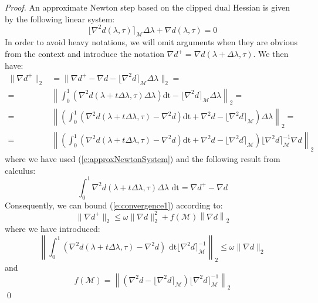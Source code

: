 \begin{proof}
An approximate Newton step based on the clipped dual Hessian is given by the following linear system:
\begin{equation} \label{e:approxNewtonSystem}
\lfloor \nabla^2 d(\lambda,\tau) \rceil_{\mathcal{M}} \Delta \lambda  + \nabla d(\lambda,\tau) = 0
\end{equation}
In order to avoid heavy notations, we will omit arguments when they are obvious from the context and introduce the notation $\nabla d^+ = \nabla d(\lambda + \Delta \lambda, \tau)$. We then have:
\begin{equation}
\begin{aligned} \label{e:convergence1}
\| \nabla d^+ \|_2 & = \| \nabla d^+ - \nabla d - \lfloor \nabla^2 d \rceil_{\mathcal{M}} \Delta \lambda \|_2 = \\
= & \left\| \int_0^1 ( \nabla^2 d(\lambda + t \Delta \lambda, \tau) \Delta \lambda ) \text{dt} -  \lfloor \nabla^2 d \rceil_{\mathcal{M}} \Delta \lambda \right\|_2 = \\
= & \left\| \left( \int_0^1 ( \nabla^2 d(\lambda + t \Delta \lambda, \tau) - \nabla^2 d ) \text{dt} + \nabla^2 d -  \lfloor \nabla^2 d \rceil_{\mathcal{M}}  \right) \Delta \lambda \right\|_2 = \\
= & \left\| \left( \int_0^1 ( \nabla^2 d(\lambda + t \Delta \lambda, \tau) - \nabla^2 d ) \text{dt} + \nabla^2 d -  \lfloor \nabla^2 d \rceil_{\mathcal{M}}  \right)  \lfloor \nabla^2 d \rceil_{\mathcal{M}}^{-1} \nabla d \right\|_2 
\end{aligned}
\end{equation}
where we have used (\ref{e:approxNewtonSystem}) and the following result from calculus:
\begin{equation}
\int_0^1 \nabla^2 d(\lambda + t \Delta \lambda, \tau)\Delta \lambda \text{ dt} = \nabla d^+ - \nabla d
\end{equation}
Consequently, we can bound (\ref{e:convergence1}) according to:
\begin{equation}
\| \nabla d^+ \|_2 \leq \omega \| \nabla d \|_2^2 + f(\mathcal{M}) \left\| \nabla d \right\|_2 
\end{equation}
where we have introduced:
\begin{equation}
\left\| \int_0^1 ( \nabla^2 d(\lambda + t \Delta \lambda, \tau) - \nabla^2 d ) \text{ dt} \lfloor \nabla^2 d \rceil_{\mathcal{M}}^{-1} \right\|_2 \leq \omega \| \nabla d \|_2
\end{equation}
and
\begin{equation}
f(\mathcal{M}) = \left\| \left( \nabla^2 d -  \lfloor \nabla^2 d \rceil_{\mathcal{M}} \right)  \lfloor \nabla^2 d \rceil_{\mathcal{M}}^{-1} \right\|_2
\end{equation}
\qed
\end{proof}

